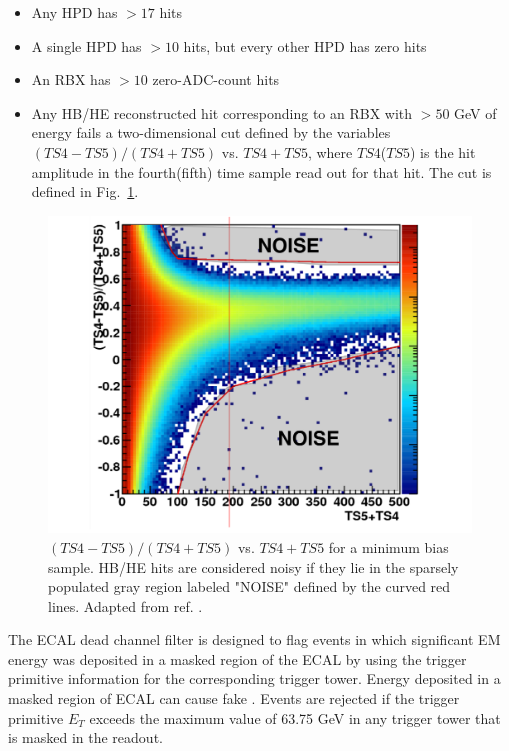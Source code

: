 \documentclass[dissertation.tex]{subfiles}
\begin{document}
\begin{itemize}
\item Any HPD has $> 17$ hits
\item A single HPD has $> 10$ hits, but every other HPD has zero hits
\item An RBX has $> 10$ zero-ADC-count hits
\item Any HB/HE reconstructed hit corresponding to an RBX with $> 50$ GeV of energy fails a two-dimensional cut defined by the variables $(TS4 - TS5)/(TS4 + TS5)$ vs. $TS4 + TS5$, where $TS4$($TS5$) is the hit amplitude in the fourth(fifth) time sample read out for that hit.  The cut is defined in Fig.~\ref{fig:R45}.
\end{itemize}

\begin{figure}
	\centering
	\includegraphics[scale=0.25]{R45}
	\caption{$(TS4 - TS5)/(TS4 + TS5)$ vs. $TS4 + TS5$ for a minimum bias sample.  HB/HE hits are considered noisy if they lie in the sparsely populated gray region labeled "NOISE" defined by the curved red lines.  Adapted from ref. \cite{Chen}.}
	\label{fig:R45}
\end{figure}

The ECAL dead channel filter is designed to flag events in which significant EM energy was deposited in a masked region of the ECAL by using the trigger primitive information for the corresponding trigger tower.  Energy deposited in a masked region of ECAL can cause fake \MET.  Events are rejected if the trigger primitive $E_{T}$ exceeds the maximum value of 63.75 GeV in any trigger tower that is masked in the readout.
\end{document}
